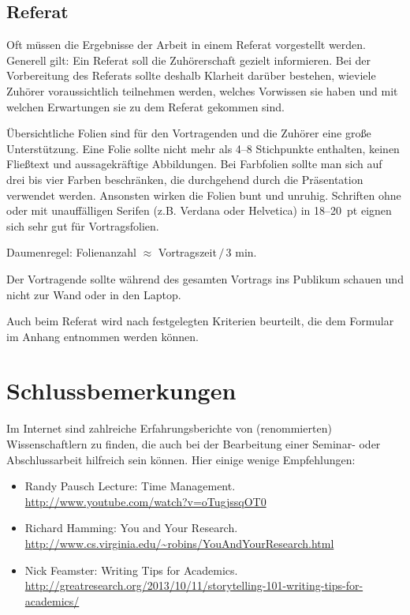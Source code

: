 \documentclass[12pt]{scrartcl}
\begin{document}
\subsection{Referat}

Oft müssen die Ergebnisse der Arbeit in einem Referat vorgestellt werden. Generell gilt: Ein Referat soll die Zuhörerschaft gezielt informieren. Bei der Vorbereitung des Referats sollte deshalb Klarheit darüber bestehen, wieviele Zuhörer voraussichtlich teilnehmen werden, welches Vorwissen sie haben und mit welchen Erwartungen sie zu dem Referat gekommen sind.

Übersichtliche Folien sind für den Vortragenden und die Zuhörer eine große Unterstützung. Eine Folie sollte nicht mehr als 4--8 Stichpunkte enthalten, keinen Fließtext und aussagekräftige Abbildungen. Bei Farbfolien sollte man sich auf drei bis vier Farben beschränken, die durchgehend durch die Präsentation verwendet werden. Ansonsten wirken die Folien bunt und unruhig. Schriften ohne oder mit unauffälligen Serifen (z.B. Verdana oder Helvetica) in 18--20~pt eignen sich sehr gut für Vortragsfolien.

Daumenregel: Folienanzahl $\approx$ Vortragszeit$\,/\,$3 min.

Der Vortragende sollte während des gesamten Vortrags ins Publikum schauen und nicht zur Wand oder in den Laptop. 

Auch beim Referat wird nach festgelegten Kriterien beurteilt, die dem Formular im Anhang entnommen werden können.

\section{Schlussbemerkungen}

Im Internet sind zahlreiche Erfahrungsberichte von (renommierten) Wissenschaftlern zu finden, die auch bei der Bearbeitung einer Seminar- oder Abschlussarbeit hilfreich sein können. Hier einige wenige Empfehlungen:

\begin{itemize}
	\item Randy Pausch Lecture: Time Management. \\\url{http://www.youtube.com/watch?v=oTugjssqOT0}
	\item Richard Hamming: You and Your Research. \\\url{http://www.cs.virginia.edu/~robins/YouAndYourResearch.html}
	\item Nick Feamster: Writing Tips for Academics. \\\url{http://greatresearch.org/2013/10/11/storytelling-101-writing-tips-for-academics/}
\end{itemize}
\end{document}
